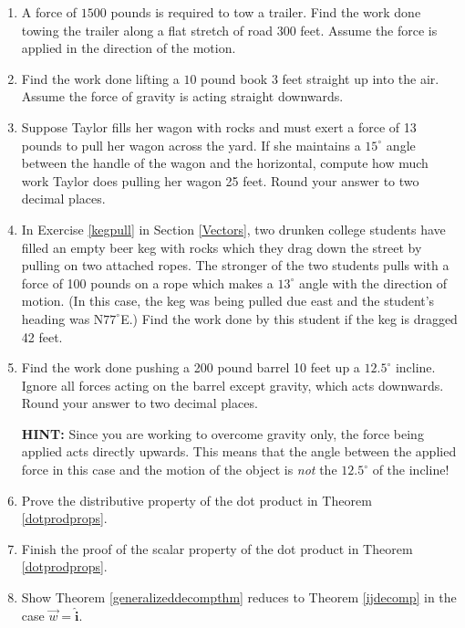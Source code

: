 \documentclass{ximera}
\begin{document}
\begin{enumerate}

\setcounter{enumi}{\value{HW}}

\item  A force of $1500$ pounds is required to tow a trailer.  Find the work done towing the trailer along a flat stretch of road $300$ feet.  Assume the force is applied in the direction of the motion.

\item  Find the work done lifting a $10$ pound book $3$ feet straight up into the air.  Assume the force of gravity is acting straight downwards.

\item  Suppose Taylor fills her wagon with rocks and must exert a force of 13 pounds to pull her wagon across the yard.  If she maintains a $15^{\circ}$ angle between the handle of the wagon and the horizontal, compute how much work Taylor does pulling her wagon 25 feet.  Round your answer to two decimal places.

\item In Exercise \ref{kegpull} in Section \ref{Vectors}, two drunken college students have filled an empty beer keg with rocks which they drag down the street by pulling on two attached ropes.  The stronger of the two students pulls with a force of 100 pounds on a rope which makes a $13^{\circ}$ angle with the direction of motion.  (In this case, the keg was being pulled due east and the student's heading was N$77^{\circ}$E.)  Find the work done by this student if the keg is dragged 42 feet.

\item  Find the work done pushing a 200 pound barrel 10 feet up a $12.5^{\circ}$ incline. Ignore all forces acting on the barrel except gravity, which acts downwards.  Round your answer to two decimal places.

\textbf{HINT:}  Since you are working to overcome gravity only, the force being applied acts directly upwards. This means that the angle between the applied force in this case and the motion of the object is \textit{not} the $12.5^{\circ}$ of the incline!

\item Prove the distributive property of the dot product in Theorem \ref{dotprodprops}.

\item Finish the proof of the scalar property of the dot product in Theorem \ref{dotprodprops}.

\item Show Theorem \ref{generalizeddecompthm} reduces to Theorem \ref{ijdecomp} in the case $\vec{w} =  \bm\hat{\text{i}}$.


\end{enumerate}
\end{document}
